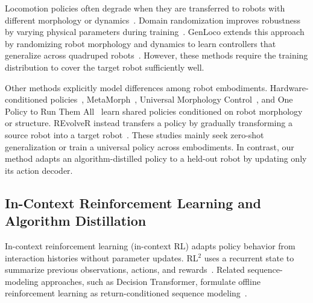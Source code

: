 \documentclass[runningheads]{llncs}
\begin{document}
Locomotion policies often degrade when they are transferred to robots with different morphology or dynamics~\cite{9308468}. Domain randomization improves robustness by varying physical parameters during training~\cite{8202133,8460528}. GenLoco extends this approach by randomizing robot morphology and dynamics to learn controllers that generalize across quadruped robots~\cite{pmlr-v205-feng23a}. However, these methods require the training distribution to cover the target robot sufficiently well.

Other methods explicitly model differences among robot embodiments. 
Hardware-conditioned policies~\cite{NEURIPS2018_b8cfbf77}, MetaMorph~\cite{gupta2022metamorph}, Universal Morphology Control~\cite{pmlr-v202-xiong23a}, and One Policy to Run Them All~\cite{pmlr-v270-bohlinger25a} learn shared policies conditioned on robot morphology or structure. REvolveR instead transfers a policy by gradually transforming a source robot into a target robot~\cite{pmlr-v162-liu22p}. These studies mainly seek zero-shot generalization or train a universal policy across embodiments. In contrast, our method adapts an algorithm-distilled policy to a held-out robot by updating only its action decoder.



\subsection{In-Context Reinforcement Learning and Algorithm Distillation}
\label{sec:incontext_rl}

In-context reinforcement learning (in-context RL) adapts policy behavior from interaction histories without parameter updates.
RL$^2$ uses a recurrent state to summarize previous observations, actions, and rewards~\cite{duan2016rl2fastreinforcementlearning}.
Related sequence-modeling approaches, such as Decision Transformer, formulate offline reinforcement learning as return-conditioned sequence modeling~\cite{NEURIPS2021_7f489f64}.
\end{document}
